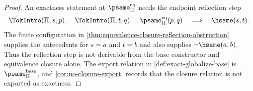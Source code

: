 \begin{proof}
An exactness statement at $\psame_{\Pi}^{\mathrm{eq}}$ needs the endpoint reflection step
$$
  \TokIntro(\Pi,s,p),\quad
  \TokIntro(\Pi,t,q),\quad
  \psame_{\Pi}^{\mathrm{eq}}(p,q)
  \quad\Longrightarrow\quad
  \hsame(s,t).
$$
The finite configuration in \autoref{thm:equivalence-closure-reflection-obstruction} supplies the antecedents for $s=a$ and $t=b$ and also supplies $\neg\hsame(a,b)$. Thus the reflection step is not derivable from the base constructor and equivalence closure alone. The export relation in \autoref{def:exact-globalize-base} is $\psame_{\Pi}^{\mathrm{base}}$, and \autoref{cor:no-closure-export} records that the closure relation is not exported as exactness.
\end{proof}
